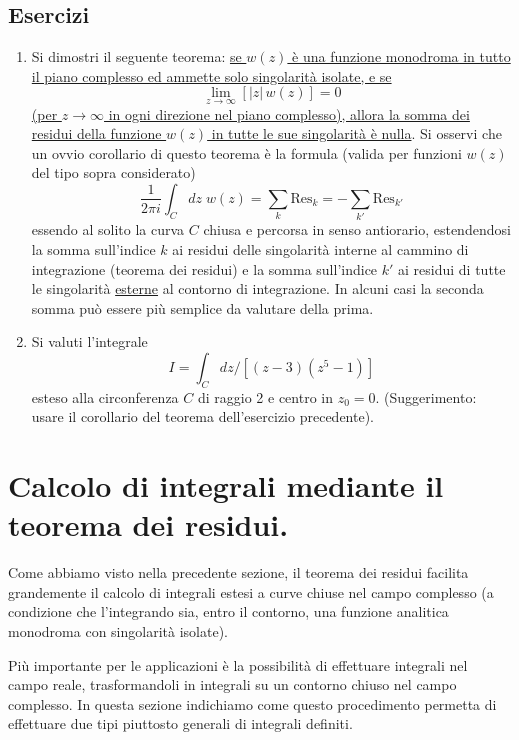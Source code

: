\documentclass[11pt, a4paper]{book}
\numberwithin{equation}{section}
\newenvironment{esercizi}{\subsection*{Esercizi}\begin{enumerate}}{\end{enumerate}}
\begin{document}
\begin{esercizi}
\item Si dimostri il seguente teorema: \uline{se $w(z)$ è una funzione monodroma in tutto il piano complesso ed ammette solo singolarità isolate, e se}
\[
\lim_{z \to \infty}\left[|z|\,w(z)\right] = 0
\]
\uline{(per $z \to \infty$ in ogni direzione nel piano complesso), allora la somma dei residui della funzione $w(z)$ in tutte le sue singolarità è nulla}.
Si osservi che un ovvio corollario di questo teorema è la formula (valida per funzioni $w(z)$ del tipo sopra considerato)
\[
\frac{1}{2\pi i}\int_C dz\; w(z) = \sum_k \mathrm{Res}_k = -\sum_{k'} \mathrm{Res}_{k'}
\]
essendo al solito la curva $C$ chiusa e percorsa in senso antiorario, estendendosi la somma sull'indice $k$ ai residui delle singolarità interne al cammino di integrazione (teorema dei residui) e la somma sull'indice $k'$%
ai residui di tutte le singolarità \uline{esterne} al contorno di integrazione. In alcuni casi la seconda somma può essere più semplice da valutare della prima.

\item Si valuti l'integrale
\[
I = \int_C dz \Big/ \left[(z-3)(z^5-1)\right]
\]
esteso alla circonferenza $C$ di raggio 2 e centro in $z_0 = 0$. (Suggerimento: usare il corollario del teorema dell'esercizio precedente).
\end{esercizi}

\section{Calcolo di integrali mediante il teorema dei residui.}

Come abbiamo visto nella precedente sezione, il teorema dei residui facilita grandemente il calcolo di integrali estesi a curve chiuse nel campo complesso (a condizione che l'integrando sia, entro il contorno, una funzione analitica monodroma con singolarità isolate).

Più importante per le applicazioni è la possibilità di effettuare integrali nel campo reale, trasformandoli in integrali su un contorno chiuso nel campo complesso. In questa sezione indichiamo come questo procedimento permetta di effettuare due tipi piuttosto generali di integrali definiti.
\end{document}
